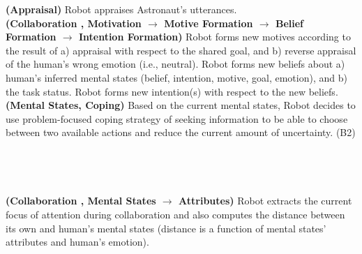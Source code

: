 \noindent\textbf{(Appraisal)} Robot appraises Astronaut's utterances.\\

\noindent\textbf{(Collaboration , Motivation $\rightarrow$ Motive Formation
$\rightarrow$ Belief Formation $\rightarrow$ Intention Formation)} Robot forms
new motives according to the result of a) appraisal with respect to the shared
goal, and b) reverse appraisal of the human's wrong emotion (i.e., neutral).
Robot forms new beliefs about a) human's inferred mental states (belief,
intention, motive, goal, emotion), and b) the task status. Robot forms new
intention(s) with respect to the new beliefs.\\

\noindent\textbf{(Mental States, Coping)} Based on the current mental states,
Robot decides to use problem-focused coping strategy of seeking information to
be able to choose between two available actions and reduce the current amount of
uncertainty. (B2)\\

\noindent{}\\

\noindent{}\\

\noindent{}\\


\noindent{}\\

\noindent\textbf{(Collaboration , Mental States $\rightarrow$ Attributes)} Robot
extracts the current focus of attention during collaboration and also computes
the distance between its own and human's mental states (distance is a function
of mental states' attributes and human's emotion).\\

